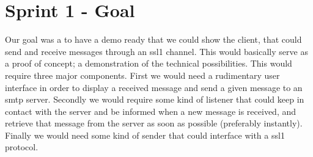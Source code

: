 \section{Sprint 1 - Goal}
Our goal was a to have a demo ready that we could show the client, that could send and receive messages through an \gls{ssl1} channel. This would basically serve as a proof of concept; a demonstration of the technical possibilities. This would require three major components. First we would need a rudimentary user interface in order to display a received message and send a given message to an \gls{smtp} server. Secondly we would require some kind of listener that could keep in contact with the server and be informed when a new message is received, and retrieve that message from the server as soon as possible (preferably instantly). Finally we would need some kind of sender that could interface with a \gls{ssl1} protocol.